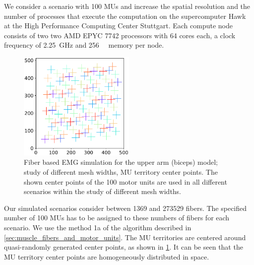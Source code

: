 We consider a scenario with 100 MUs and increase the spatial resolution and the number of processes that execute the computation on the supercomputer Hawk at the High Performance Computing Center Stuttgart. Each compute node consists of two two AMD EPYC 7742 processors with 64 cores each, a clock frequency of \SI{2.25}{\giga\hertz} and \SI{256}{\giga\byte} memory per node.

\begin{figure}
  \centering%
  \includegraphics[width=0.5\textwidth]{images/results/application/MU_fibre_distribution_523x523_100mus_txt_mu_positions.pdf}%
  \caption{Fiber based EMG simulation for the upper arm (biceps) model; study of different mesh widths, MU territory center points. The shown center points of the 100 motor units are used in all different scenarios within the study of different mesh widths.}%
  \label{fig:MU_fibre_distribution_523x523_100mus_txt_mu_positions}%
\end{figure}

Our simulated scenarios consider between \num{1369} and \num{273529} fibers. The specified number of 100 MUs has to be assigned to these numbers of fibers for each scenario.
We use the method 1a of the algorithm described in \cref{sec:muscle_fibers_and_motor_units}. The MU territories are centered around quasi-randomly generated center points, as shown in \cref{fig:MU_fibre_distribution_523x523_100mus_txt_mu_positions}. It can be seen that the MU territory center points are homogeneously distributed in space.


